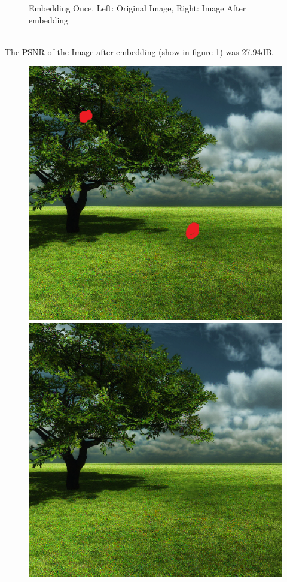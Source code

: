 \documentclass[12pt]{article}
\begin{document}
\begin{figure}[h]
{}%
\caption{Embedding Once. Left: Original Image, Right: Image After embedding}
\label{fig:treeEmbedOnceEmbedding}
\end{figure}

\hspace{0pt} \\
The PSNR of the Image after embedding (show in figure \ref{fig:treeEmbedOnceEmbedding}) was 27.94dB.

\begin{figure}[h]
\centerline{%
\includegraphics[scale=0.45]{"Tree Embed once 0.8 threshold/finalImage - Copy"}%
\hspace{0.1cm}
\includegraphics[scale=0.45]{"Tree Embed once 0.8 threshold/finalImageAfterRestoration"}%
}
\end{figure}
\end{document}

